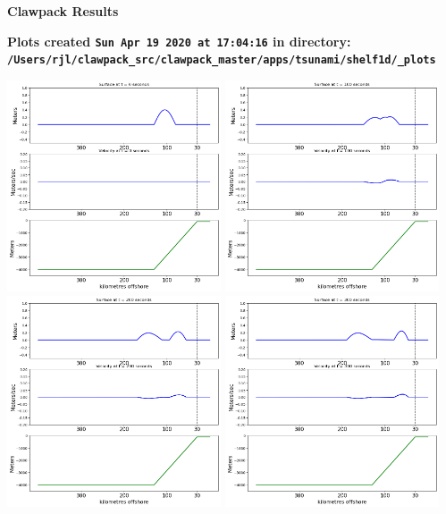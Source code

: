 \documentclass[11pt]{article}
\begin{document}
        \begin{center}{\Large\bf Clawpack Results}\vskip 5pt
        
        \bf Plots created {\tt Sun Apr 19 2020 at 17:04:16} in directory: \vskip 5pt
        \verb+/Users/rjl/clawpack_src/clawpack_master/apps/tsunami/shelf1d/_plots+
        \end{center}
        \vskip 5pt
        \includegraphics[width=0.475\textwidth]{frame0000fig2.png}
\vskip 10pt 
\includegraphics[width=0.475\textwidth]{frame0001fig2.png}
\vskip 10pt 
\includegraphics[width=0.475\textwidth]{frame0002fig2.png}
\vskip 10pt 
\includegraphics[width=0.475\textwidth]{frame0003fig2.png}
\end{document}
